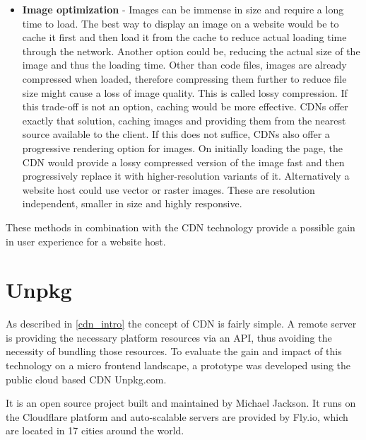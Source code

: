\begin{itemize}
	\item \textbf{Image optimization} - Images can be immense in size and require a long time to load. The best way to display an image on a website would be to cache it first and then load it from the cache to reduce actual loading time through the network. Another option could be, reducing the actual size of the image and thus the loading time.
	Other than code files, images are already compressed when loaded, therefore compressing them further to reduce file size might cause a loss of image quality. This is called lossy compression. If this trade-off is not an option, caching would be more effective.
	CDNs offer exactly that solution, caching images and providing them from the nearest source available to the client. If this does not suffice, CDNs also offer a progressive rendering option for images. On initially loading the page, the CDN would provide a lossy compressed version of the image fast and then progressively replace it with higher-resolution variants of it.
	Alternatively a website host could use vector or raster images. These are resolution independent, smaller in size and highly responsive.\cite{cdn_fe_opt_img_opt}
\end{itemize}

These methods in combination with the CDN technology provide a possible gain in user experience for a website host. \cite{cdn_fe_opt}
\section{Unpkg}

As described in \ref{cdn_intro} the concept of CDN is fairly simple. A remote server is providing the necessary platform resources via an API, thus avoiding the necessity of bundling those resources.
To evaluate the gain and impact of this technology on a micro frontend landscape, a prototype was developed using the public cloud based CDN Unpkg.com.

It is an open source project built and maintained by Michael Jackson. It runs on the Cloudflare platform and auto-scalable servers are provided by Fly.io, which are located in 17 cities around the world.\cite{unpkg_doc}

